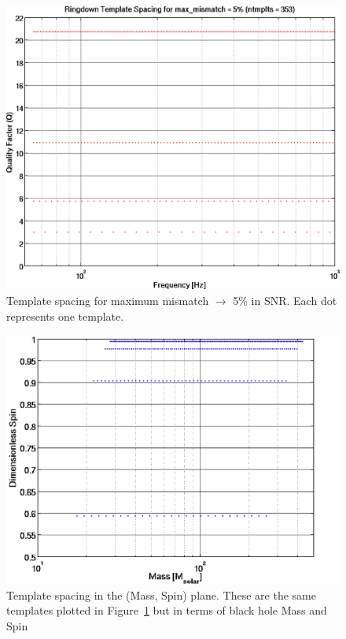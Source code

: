 \begin{figure}[!h]
\centerline{\includegraphics[angle=0,width=6.5in]{Figures/Chap7/templatespacing_f_Q.png}}
\caption[Template Spacing (f,Q)]{Template spacing for maximum mismatch $\rightarrow$ 5\% in SNR. 
         Each dot represents one template.}
\label{fig:templates_f_Q}
\end{figure}

\begin{figure}[!h]
\centerline{\includegraphics[angle=0,width=6.5in]{Figures/Chap7/templatespacing_M_a.png}}
\caption[Template Spacing (M,a)]{Template spacing in the (Mass, Spin) plane. These are the
                          same templates plotted in Figure~\ref{fig:templates_f_Q} 
                          but in terms of black hole Mass and Spin}
\label{fig:templates_M_a}
\end{figure}



